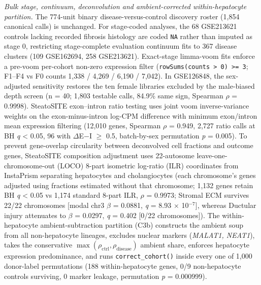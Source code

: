 \emph{Bulk stage, continuum, deconvolution and ambient-corrected within-hepatocyte partition.} The 774-unit binary disease-versus-control discovery roster (1,854 canonical calls) is unchanged. For stage-coded analyses, the 68 GSE213621 controls lacking recorded fibrosis histology are coded \texttt{NA} rather than imputed as stage 0, restricting stage-complete evaluation continuum fits to 367 disease clusters (109 GSE162694, 258 GSE213621). Exact-stage limma-voom fits enforce a pre-voom per-cohort non-zero expression filter (\texttt{rowSums(counts > 0) >= 3}; F1--F4 vs F0 counts 1,338 / 4,269 / 6,190 / 7,042). In GSE126848, the sex-adjusted sensitivity restores the ten female libraries excluded by the male-biased depth screen (n = 40; 1,803 testable calls, 84.9\% same sign, Spearman $\rho$ = 0.9998). SteatoSITE exon--intron ratio testing uses joint voom inverse-variance weights on the exon-minus-intron log-CPM difference with minimum exon/intron mean expression filtering (12,010 genes, Spearman $\rho$ = 0.949, 2,727 ratio calls at BH \emph{q} \textless{} 0.05, 96 with \textbar$\Delta$E$-$I\textbar{} $\ge$ 0.5, batch-by-sex permutation \emph{p} = 0.005). To prevent gene-overlap circularity between deconvolved cell fractions and outcome genes, SteatoSITE composition adjustment uses 22-autosome leave-one-chromosome-out (LOCO) 8-part isometric log-ratio (ILR) coordinates from InstaPrism separating hepatocytes and cholangiocytes (each chromosome's genes adjusted using fractions estimated without that chromosome; 1,132 genes retain BH \emph{q} \textless{} 0.05 vs 1,174 standard 8-part ILR, $\rho$ = 0.9973; Stromal ECM survives 22/22 chromosomes [modal chr3 $\beta$ = 0.0881, \emph{q} = 8.93 $\times$ 10$^{-7}$], whereas Ductular injury attenuates to $\beta$ = 0.0297, \emph{q} = 0.402 [0/22 chromosomes]). The within-hepatocyte ambient-subtraction partition (C3b) constructs the ambient soup from all non-hepatocyte lineages, excludes nuclear markers (\emph{MALAT1, NEAT1}), takes the conservative $\max(\rho_{\mathrm{ctrl}}, \rho_{\mathrm{disease}})$ ambient share, enforces hepatocyte expression predominance, and runs \texttt{correct\_cohort()} inside every one of 1,000 donor-label permutations (188 within-hepatocyte genes, 0/9 non-hepatocyte controls surviving, 0 marker leakage, permutation \emph{p} = 0.000999).

